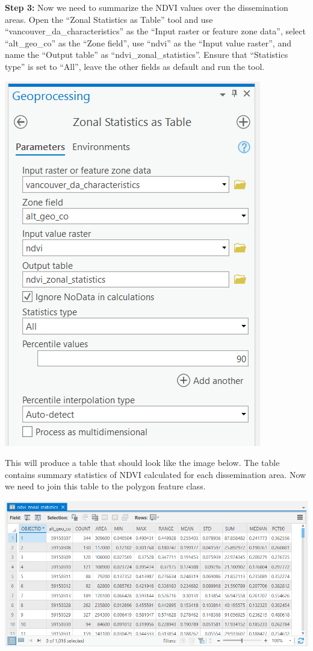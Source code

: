 \documentclass[
]{book}
\begin{document}
\textbf{Step 3:} Now we need to summarize the NDVI values over the dissemination areas. Open the ``Zonal Statistics as Table'' tool and use ``vancouver\_da\_characteristics'' as the ``Input raster or feature zone data'', select ``alt\_geo\_co'' as the ``Zone field'', use ``ndvi'' as the ``Input value raster'', and name the ``Output table'' as ``ndvi\_zonal\_statistics''. Ensure that ``Statistics type'' is set to ``All'', leave the other fields as default and run the tool.

\includegraphics[width=0.75\linewidth]{images/05-arcgis-zonal-statistics}

This will produce a table that should look like the image below. The table contains summary statistics of NDVI calculated for each dissemination area. Now we need to join this table to the polygon feature class.

\includegraphics[width=0.75\linewidth]{images/05-arcgis-zonal-statistics-table}
\end{document}
